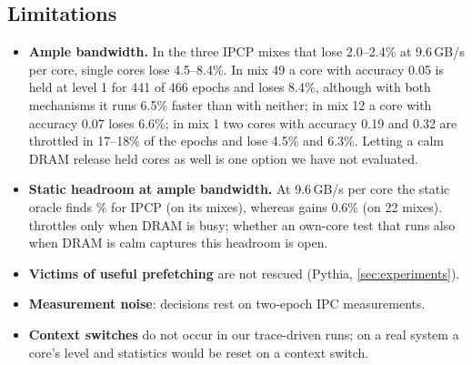 \subsection{Limitations}
\label{sec:limits}
\begin{itemize}
  \item \textbf{Ample bandwidth.}  In the three IPCP mixes that lose 2.0--2.4\% at 9.6\,GB/s per core, single cores
        lose 4.5--8.4\%.  In mix 49 a core with accuracy 0.05 is held at level 1 for 441 of 466 epochs and loses
        8.4\%, although with both mechanisms it runs 6.5\% faster than with neither; in mix 12 a core with accuracy
        0.07 loses 6.6\%; in mix 1 two cores with accuracy 0.19 and 0.32 are throttled in 17--18\% of the epochs and
        lose 4.5\% and 6.3\%.  Letting a calm DRAM release held cores as well is one option we have not evaluated.
  \item \textbf{Static headroom at ample bandwidth.}  At 9.6\,GB/s per core the static oracle finds \OrcIpMean\% for
        IPCP (on its \OrcIpN{} mixes), whereas \vthree{} gains 0.6\% (on 22 mixes).  \vthree{} throttles only when
        DRAM is busy; whether an own-core test that runs also when DRAM is calm captures this headroom is open.
  \item \textbf{Victims of useful prefetching} are not rescued (Pythia, \cref{sec:experiments}).
  \item \textbf{Measurement noise}: decisions rest on two-epoch IPC measurements.
  \item \textbf{Context switches} do not occur in our trace-driven runs; on a real system a core's level and
        statistics would be reset on a context switch.
\end{itemize}
